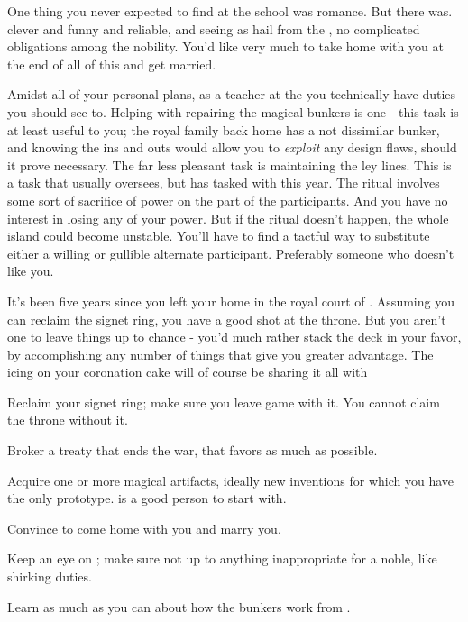 \documentclass[char]{GL2020}
\begin{document}
One thing you never expected to find at the school was romance. But there \cPirate{} was. \cPirate{\They} \cPirate{\are} clever and funny and reliable, and seeing as \cPirate{\they} hail\cPirate{\plural} from the \pShip{}, \cPirate{\have} no complicated obligations among the \pFarm{} nobility. You’d like very much to take \cPirate{} home with you at the end of all of this and get married.

Amidst all of your personal plans, as a teacher at the \pSchool{} you technically have duties you should see to. Helping \cBunker{} with repairing the magical bunkers is one - this task is at least useful to you; the royal family back home has a not dissimilar bunker, and knowing the ins and outs would allow you to \emph{exploit} any design flaws, should it prove necessary. The far less pleasant task is maintaining the ley lines. This is a task that \cPrincipal{} usually oversees, but has tasked \cBeetle{} with this year. The ritual involves some sort of sacrifice of power on the part of the participants. And you have no interest in losing any of your power. But if the ritual doesn’t happen, the whole island could become unstable. You’ll have to find a tactful way to substitute either a willing or gullible alternate participant. Preferably someone who doesn’t like you.

It’s been five years since you left your home in the royal court of \pFarm{}. Assuming you can reclaim the signet ring, you have a good shot at the throne. But you aren’t one to leave things up to chance - you’d much rather stack the deck in your favor, by accomplishing any number of things that give you greater advantage. The icing on your coronation cake will of course be sharing it all with \cPirate{}

\begin{itemz}[Goals]
	\item Reclaim your signet ring; make sure you leave game with it. You cannot claim the \pFarm{} throne without it.
\item Broker a treaty that ends the war, that favors \pFarm{} as much as possible.
\item Acquire one or more magical artifacts, ideally new inventions for which you have the only prototype. \cCurse{} is a good person to start with.
\item Convince \cPirate{} to come home with you and marry you.
	\item Keep an eye on \cAdopted{}; make sure \cAdopted{\they} \cAdopted{\are} not up to anything inappropriate for a noble, like shirking \cAdopted{\their} duties.
\item Learn as much as you can about how the bunkers work from \cBunker{}. 
\end{itemz}
\end{document}
